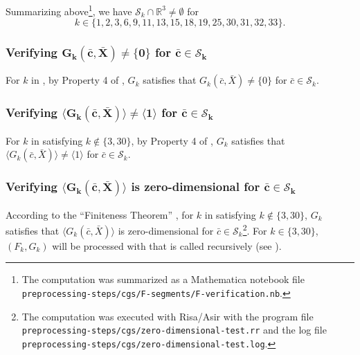 \documentclass{birkjour}
\theoremstyle{plain}
\theoremstyle{definition}
\newcommand{\R}[0]{\mathbb{R}}
\newcommand{\cbar}[0]{\bar{c}}
\newcommand{\Xbar}{\bar{X}}
\begin{document}
    Summarizing above\footnote{The computation was summarized as a Mathematica notebook file 
    \texttt{preprocessing-steps/cgs/F-segments/F-verification.nb}.}, we have $\mathcal{S}_{k}\cap\R^3\ne\emptyset$ for 
    \begin{equation}
        \label{eq:valid-segment-index}
        k\in\{1,2,3,6,9,11,13,15,18,19,25,30,31,32,33\}.
    \end{equation}
    

    \subsubsection{Verifying $\bm{G_k(\bar{c},\bar{X})\ne\{0\}}$ for $\bm{\bar{c}\in\mathcal{S}_k}$}

    For $k$ in , by Property 4 of , $G_k$ satisfies 
    that $G_k(\bar{c},\bar{X})\ne\{0\}$ for $\bar{c}\in\mathcal{S}_k$.

    \subsubsection{Verifying $\bm{\langle G_{k}(\cbar,\Xbar)\rangle\ne\langle 1\rangle}$
     for $\bm{\bar{c}\in\mathcal{S}_k}$}

    For $k$ in  satisfying $k\not\in\{3,30\}$, by Property 4 of , $G_k$ satisfies that $\langle G_{k}(\cbar,\Xbar)\rangle\ne\langle 1\rangle$ for $\bar{c}\in\mathcal{S}_k$.

    \subsubsection{Verifying $\bm{\langle G_{k}(\cbar,\Xbar)\rangle}$ is zero-dimensional 
    for $\bm{\bar{c}\in\mathcal{S}_k}$}

    According to the ``Finiteness Theorem'' \cite[Chapter 5, Section 3, Theorem 6]{cox-lit-osh2015},
    for $k$ in  satisfying $k\not\in\{3,30\}$, 
    $G_k$ satisfies that $\langle G_{k}(\cbar,\Xbar)\rangle$ is zero-dimensional for $\bar{c}\in\mathcal{S}_k$\footnote{The computation was executed with Risa/Asir with the program file \texttt{preprocessing-steps/cgs/zero-dimensional-test.rr} and the log file \texttt{preprocessing-steps/cgs/zero-dimensional-test.log}.\label{footnote:zero-dimensional}}. For $k\in\{3,30\}$, $(F_k,G_k)$ will be processed with 
     that is called recursively (see
    ).
\end{document}
